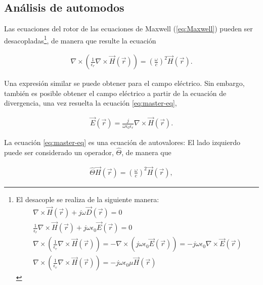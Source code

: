 \subsection{Análisis de automodos}
\label{sec:automodos}

Las ecuaciones del rotor de las ecuaciones de Maxwell (\ref{eq:Maxwell}) pueden ser desacopladas\footnote{El desacople se realiza de la siguiente manera:
	\begin{align*}
		\nabla \times \vec{H}(\vec{r}) + j\omega\vec{D}(\vec{r}) = 0 \\
		\frac{1}{\epsilon_r} \nabla \times \vec{H}(\vec{r}) + j\omega\epsilon_0\vec{E}(\vec{r}) = 0 \\
		\nabla \times \left(\frac{1}{\epsilon_r} \nabla \times \vec{H}(\vec{r})\right)= - \nabla \times (j\omega\epsilon_0\vec{E}(\vec{r})) = -j \omega\epsilon_0 \nabla \times \vec{E}(\vec{r}) \\
		\nabla \times \left(\frac{1}{\epsilon_r} \nabla \times \vec{H}(\vec{r})\right) = -j \omega\epsilon_0 \mu \vec{H}(\vec{r})
	\end{align*}
	
	}, de manera que resulte la ecuación
	
	\begin{align}
		\label{eq:master-eq}
		\nabla \times \left(\frac{1}{\epsilon_r} \nabla \times \vec{H}(\vec{r}) \right) = \left(\frac{\omega}{c}\right)^2 \vec{H}(\vec{r}).
	\end{align}

Una expresión similar se puede obtener para el campo eléctrico. Sin embargo, también es posible obtener el campo eléctrico a partir de la ecuación de divergencia, una vez resuelta la ecuación \ref{eq:master-eq},

\begin{align}
	\vec{E}(\vec{r}) = \frac{j}{\omega \epsilon_0 \epsilon_r} \nabla \times \vec{H}(\vec{r}).
\end{align}

La ecuación \ref{eq:master-eq} es una ecuación de autovalores: El lado izquierdo puede ser considerado un operador, $\hat{\Theta}$, de manera que

\begin{align}
	\hat{\Theta} \vec{H}(\vec{r}) = \left(  \frac{\omega}{c} \right)^2 \vec{H}(\vec{r}),
\end{align}

